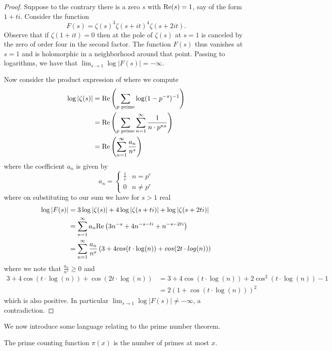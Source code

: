 \begin{proof}
    Suppose to the contrary there is a zero $s$ with $\mathrm{Re}(s)=1$, say of the form $1+ti$. Consider the function 
    $$F(s)=\zeta(s)^{3}\zeta(s+it)^{4}\zeta(s+2it).$$
    Observe that if $\zeta(1+it)=0$ then at the pole of $\zeta(s)$ at $s=1$ is canceled by the zero of order four in the second factor. The function $F(s)$ thus vanishes at $s=1$ and is holomorphic in a neighborhood around that point. Passing to logarithms, we have that $\lim_{s\to 1}\log|F(s)|=-\infty$. 

    Now consider the product expression of  where we compute 
    \begin{align*}
        \log|\zeta(s)| &= \mathrm{Re}\left(\sum_{p\text{ prime}}\log(1-p^{-s})^{-1}\right) \\
        &= \mathrm{Re}\left(\sum_{p\text{ prime}}\sum_{n=1}^{\infty}\frac{1}{n\cdot p^{ns}}\right) \\
        &= \mathrm{Re}\left(\sum_{n=1}^{\infty}\frac{a_{n}}{n^{s}}\right)
    \end{align*}
    where the coefficient $a_{n}$ is given by 
    $$a_{n}=\begin{cases}
        \frac{1}{r} & n = p^{r} \\
        0 & n\neq p^{r}
    \end{cases}$$
    where on substituting to our sum we have for $s>1$ real
    \begin{align*}
        \log|F(s)| &= 3\log|\zeta(s)| + 4\log|\zeta(s+ti)| + \log|\zeta(s+2ti)| \\
        &=  \sum_{n=1}^{\infty}a_{n}\mathrm{Re}\left(3n^{-s}+ 4n^{-s-ti}+n^{-s-2ti}\right) \\
        &= \sum_{n=1}^{\infty}\frac{a_{n}}{n^{s}}\left(3+4cos(t\cdot\log(n))+cos(2t\cdot log(n))\right)
    \end{align*}
    where we note that $\frac{a_{n}}{n^{s}}\geq0$ and 
    \begin{align*}
        3+4\cos(t\cdot\log(n))+\cos(2t\cdot \log(n))&=3+4\cos(t\cdot\log(n))+2\cos^{2}(t\cdot \log(n))-1\\
        &=2(1+\cos(t\cdot\log(n)))^{2}
    \end{align*}
    which is also positive. In particular $\lim_{s\to 1}\log|F(s)|\neq-\infty$, a contradiction.
\end{proof}
We now introduce some language relating to the prime number theorem. 
\begin{definition}\label{def: prime counting function}
    The prime counting function $\pi(x)$ is the number of primes at most $x$. 
\end{definition}
